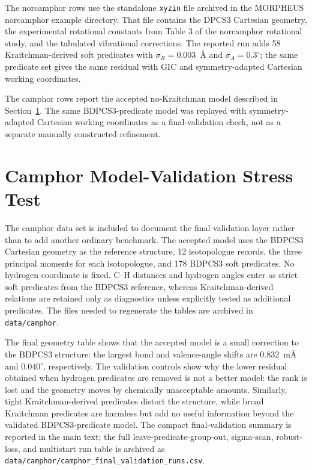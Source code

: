 \documentclass[12pt]{article}
\begin{document}
The norcamphor rows use the standalone \texttt{xyzin} file archived in the
MORPHEUS norcamphor example directory.  That file contains the DPCS3 Cartesian
geometry, the experimental rotational constants from Table 3 of the
norcamphor rotational study, and the tabulated vibrational corrections.  The
reported run adds 58 Kraitchman-derived soft predicates with
$\sigma_R=0.003$~\AA{} and $\sigma_A=0.3^\circ$; the same predicate set gives
the same residual with GIC and symmetry-adapted Cartesian working coordinates.

The camphor rows report the accepted no-Kraitchman model described in
Section~\ref{sec:si-camphor}. The same BDPCS3-predicate model was replayed
with symmetry-adapted Cartesian working coordinates as a final-validation
check, not as a separate manually constructed refinement.

\section{Camphor Model-Validation Stress Test}
\label{sec:si-camphor}

The camphor data set is included to document the final validation layer rather
than to add another ordinary benchmark. The accepted model uses the BDPCS3
Cartesian geometry as the reference structure, 12 isotopologue records, the
three principal moments for each isotopologue, and 178 BDPCS3 soft predicates.
No hydrogen coordinate is fixed. C--H distances and hydrogen angles enter as
strict soft predicates from the BDPCS3 reference, whereas Kraitchman-derived
relations are retained only as diagnostics unless explicitly tested as
additional predicates. The files needed to regenerate the tables are archived
in \texttt{data/camphor}.







The final geometry table shows that the accepted model is a small correction
to the BDPCS3 structure: the largest bond and valence-angle shifts are
0.832~m\AA{} and $0.040^\circ$, respectively. The validation controls show why
the lower residual obtained when hydrogen predicates are removed is not a
better model: the rank is lost and the geometry moves by chemically
unacceptable amounts. Similarly, tight Kraitchman-derived predicates distort
the structure, while broad Kraitchman predicates are harmless but add no
useful information beyond the validated BDPCS3-predicate model. The compact
final-validation summary is reported in the main text; the full
leave-predicate-group-out, sigma-scan, robust-loss, and multistart run table is
archived as \texttt{data/camphor/camphor\_final\_validation\_runs.csv}.
\end{document}

